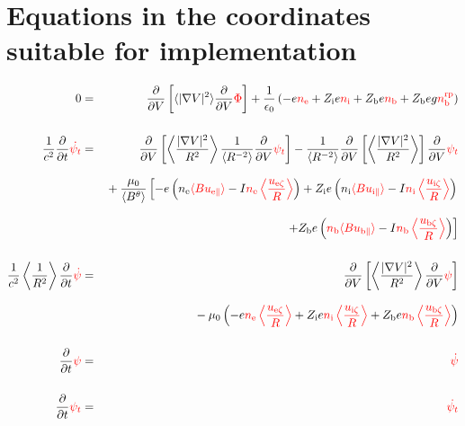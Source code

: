 \documentclass[11pt]{article}
\def\r#1{{\rm#1}}
\def\ave#1{\left\langle#1\right\rangle}
\def\aves#1{\langle#1\rangle}
\def\dd#1#2{\frac{\partial #1}{\partial #2}}
\def\para{\parallel}
\def\ddV{\frac{\partial}{\partial V}}
\def\psid{\dot{\psi}}
\def\psit{\psi_t}
\def\psitd{\dot{\psit}}
\def\nee{n_\r{e}}
\def\ni{n_\r{i}}
\def\nb{n_\r{b}}
\def\Zi{Z_\r{i}}
\def\Zb{Z_\r{b}}
\def\uezt{u_{\r{e}\zeta}}
\def\uizt{u_{\r{i}\zeta}}
\def\ubzt{u_{\r{b}\zeta}}
\def\uepara{u_{\r{e}\para}}
\def\uipara{u_{\r{i}\para}}
\def\ubpara{u_{\r{b}\para}}
\def\ddt{\frac{\partial}{\partial t}}
\def\nbrp{n_\r{b}^\r{rp}}
\def\red#1{\textcolor{red}{#1}}
\begin{document}
\bigskip

\section{Equations in the coordinates suitable for implementation}
\setcounter{equation}{0}

\begin{eqnarray}
  0 &=&
%
    \ddV \left[ \aves{|\nabla V|^2} \ddV{\red{\Phi}} \right]
%
  + \frac{1}{\epsilon_0}
%
    \left(-e \red{\nee} + \Zi e \red{\ni} + \Zb e \red{\nb} + \Zb e g \red{\nbrp} \right)
\\[5mm]
%
  \frac{1}{c^2} \ddt \red{\psitd} &=&
%
     \ddV \left[ \ave{\frac{|\nabla V|^2}{R^2}} \frac{1}{\aves{R^{-2}}} \ddV \red{\psit} \right]
   - \frac{1}{\aves{R^{-2}}} \ddV \left[ \ave{\frac{|\nabla V|^2}{R^2}}
				  \right] \ddV  \red{\psit}
 \nonumber\\[3mm]&&{}
%
  + \frac{\mu_0}{\aves{B^\theta}}
%
    \left[-     e \left( \nee \red{\aves{B\uepara}} - I\red{\nee \ave{\frac{\uezt}{R}}} \right)
          + \Zi e \left( \ni \red{\aves{B\uipara}} - I\red{\ni  \ave{\frac{\uizt}{R}}} \right)
    \right.\nonumber\\[3mm]&&{}
    \left.+ \Zb e  \left( \red{\nb \aves{B\ubpara}} - I\red{\nb \ave{\frac{\ubzt}{R}}} \right) \right]
\\[5mm]
  \frac{1}{c^2} \ave{\frac{1}{R^2}} \ddt \red{\psid} &=&
%
  \ddV \left[ \ave{\frac{|\nabla V|^2}{R^2}}
				    \ddV \red{\psi} \right] \nonumber\\[3mm]&&{}
%
  - \mu_0 \left(-     e \red{\nee \ave{\frac{\uezt}{R}}}
                + \Zi e \red{\ni  \ave{\frac{\uizt}{R}}}
	        + \Zb e \red{\nb  \ave{\frac{\ubzt}{R}}} \right)
%
\\[5mm]
  \ddt \red{\psi} &=&
%
  \red{\psid}
\\[5mm]
  \ddt \red{\psit} &=&
%
  \red{\psitd}
\end{eqnarray}
%
\end{document}
